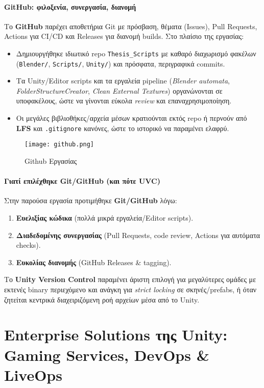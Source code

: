 \paragraph*{GitHub: φιλοξενία, συνεργασία, διανομή}
Το \textbf{GitHub} παρέχει αποθετήρια Git με πρόσβαση, θέματα (Issues), Pull Requests, Actions για CI/CD και Releases για διανομή builds. Στο πλαίσιο της εργασίας:
\begin{itemize}
  \item Δημιουργήθηκε ιδιωτικό repo \texttt{Thesis\_Scripts} με καθαρό διαχωρισμό φακέλων (\texttt{Blender/}, \texttt{Scripts/}, \texttt{Unity/}) και πρόσφατα, περιγραφικά commits.
  \item Τα Unity/Editor scripts και τα εργαλεία pipeline (\emph{Blender automata}, \emph{FolderStructureCreator}, \emph{Clean External Textures}) οργανώνονται σε υποφακέλους, ώστε να γίνονται εύκολα \textit{review} και επαναχρησιμοποίηση.
  \item Οι μεγάλες βιβλιοθήκες/αρχεία μέσων κρατιούνται εκτός repo ή περνούν από \textbf{LFS} και \texttt{.gitignore} κανόνες, ώστε το ιστορικό να παραμένει ελαφρύ.
\end{itemize}

\begin{figure}[H]
    \centering
    \texttt{[image: github.png]}
    \caption{Github Εργασίας}
    \label{fig:placeholder}
\end{figure}

\paragraph*{Γιατί επιλέχθηκε Git/GitHub (και πότε UVC)}
Στην παρούσα εργασία προτιμήθηκε \textbf{Git/GitHub} λόγω:
\begin{enumerate}
  \item \textbf{Ευελιξίας κώδικα} (πολλά μικρά εργαλεία/Editor scripts).
  \item \textbf{Διαδεδομένης συνεργασίας} (Pull Requests, code review, Actions για αυτόματα checks).
  \item \textbf{Ευκολίας διανομής} (GitHub Releases \& tagging).
\end{enumerate}

Το \textbf{Unity Version Control} παραμένει άριστη επιλογή για μεγαλύτερες ομάδες με εκτενές binary περιεχόμενο και ανάγκη για \emph{strict locking} σε σκηνές/prefabs, ή όταν ζητείται κεντρικά διαχειριζόμενη ροή αρχείων μέσα από το Unity.

\section{Enterprise Solutions της Unity: Gaming Services, DevOps \& LiveOps}

